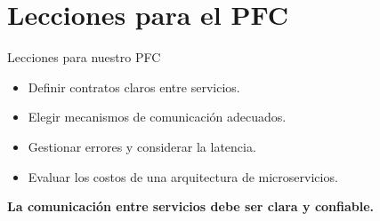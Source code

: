 \section{Lecciones para el PFC}

\begin{frame}{Lecciones para nuestro PFC}

    \begin{itemize}
        \item Definir contratos claros entre servicios.
        \item Elegir mecanismos de comunicación adecuados.
        \item Gestionar errores y considerar la latencia.
        \item Evaluar los costos de una arquitectura de microservicios.
    \end{itemize}

    \vspace{0.3cm}

    \centering
    \textbf{La comunicación entre servicios debe ser clara y confiable.}

    \parencite{abgaz2023decomposition}
\end{frame}
